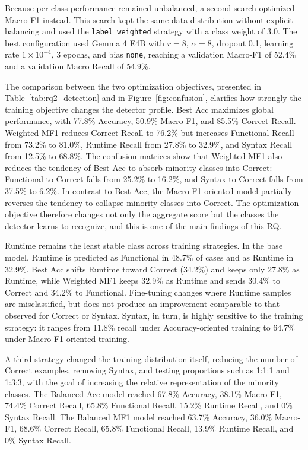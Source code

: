 Because per-class performance remained unbalanced, a second search optimized Macro-F1 instead. This search kept the same data distribution without explicit balancing and used the \texttt{label\_weighted} strategy with a class weight of 3.0. The best configuration used Gemma 4 E4B with $r=8$, $\alpha=8$, dropout 0.1, learning rate $1\times10^{-4}$, 3 epochs, and bias \texttt{none}, reaching a validation Macro-F1 of 52.4\% and a validation Macro Recall of 54.9\%.

The comparison between the two optimization objectives, presented in Table~\ref{tab:rq2_detection} and in Figure~\ref{fig:confusion}, clarifies how strongly the training objective changes the detector profile. Best Acc maximizes global performance, with 77.8\% Accuracy, 50.9\% Macro-F1, and 85.5\% Correct Recall. Weighted MF1 reduces Correct Recall to 76.2\% but increases Functional Recall from 73.2\% to 81.0\%, Runtime Recall from 27.8\% to 32.9\%, and Syntax Recall from 12.5\% to 68.8\%. The confusion matrices show that Weighted MF1 also reduces the tendency of Best Acc to absorb minority classes into Correct: Functional to Correct falls from 25.2\% to 16.2\%, and Syntax to Correct falls from 37.5\% to 6.2\%. In contrast to Best Acc, the Macro-F1-oriented model partially reverses the tendency to collapse minority classes into Correct. The optimization objective therefore changes not only the aggregate score but the classes the detector learns to recognize, and this is one of the main findings of this RQ.

Runtime remains the least stable class across training strategies. In the base model, Runtime is predicted as Functional in 48.7\% of cases and as Runtime in 32.9\%. Best Acc shifts Runtime toward Correct (34.2\%) and keeps only 27.8\% as Runtime, while Weighted MF1 keeps 32.9\% as Runtime and sends 30.4\% to Correct and 34.2\% to Functional. Fine-tuning changes where Runtime samples are misclassified, but does not produce an improvement comparable to that observed for Correct or Syntax. Syntax, in turn, is highly sensitive to the training strategy: it ranges from 11.8\% recall under Accuracy-oriented training to 64.7\% under Macro-F1-oriented training.

A third strategy changed the training distribution itself, reducing the number of Correct examples, removing Syntax, and testing proportions such as 1:1:1 and 1:3:3, with the goal of increasing the relative representation of the minority classes. The Balanced Acc model reached 67.8\% Accuracy, 38.1\% Macro-F1, 74.4\% Correct Recall, 65.8\% Functional Recall, 15.2\% Runtime Recall, and 0\% Syntax Recall. The Balanced MF1 model reached 63.7\% Accuracy, 36.0\% Macro-F1, 68.6\% Correct Recall, 65.8\% Functional Recall, 13.9\% Runtime Recall, and 0\% Syntax Recall.

